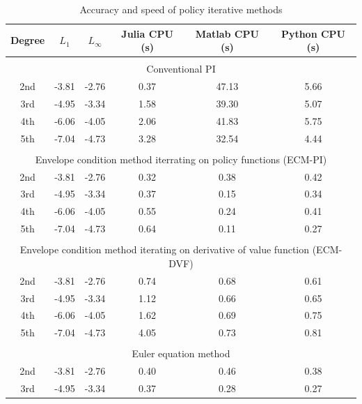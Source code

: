 \begin{table}[tph]
  \caption{Accuracy and speed of policy iterative methods}
  \label{clmm:Table2}\vspace{-0.3cm}
  \par
  \begin{center}
  \begin{threeparttable}
{\footnotesize
  \begin{tabular}{c|cc|ccc}
    \hline \hline
    Degree & $L_1$ & $L_\infty$ & Julia CPU (s) & Matlab CPU (s) & Python CPU (s) \\ \hline
    \multicolumn{6}{c}{} \\
    \multicolumn{6}{c}{Conventional PI} \\ \hline
    2nd & -3.81 & -2.76 & 0.37 & 47.13 & 5.66 \\
    3rd & -4.95 & -3.34 & 1.58 & 39.30 & 5.07 \\
    4th & -6.06 & -4.05 & 2.06 & 41.83 & 5.75 \\
    5th & -7.04 & -4.73 & 3.28 & 32.54 & 4.44 \\ \hline
    \multicolumn{6}{c}{} \\
    \multicolumn{6}{c}{Envelope condition method iterrating on policy functions
    (ECM-PI)} \\ \hline
    2nd & -3.81 & -2.76 & 0.32 & 0.38 & 0.42 \\
    3rd & -4.95 & -3.34 & 0.37 & 0.15 & 0.34 \\
    4th & -6.06 & -4.05 & 0.55 & 0.24 & 0.41 \\
    5th & -7.04 & -4.73 & 0.64 & 0.11 & 0.27 \\ \hline
    \multicolumn{6}{c}{} \\
    \multicolumn{6}{c}{Envelope condition method iterating on derivative of
    value function (ECM-DVF)} \\ \hline
    2nd & -3.81 & -2.76 & 0.74 & 0.68 & 0.61 \\
    3rd & -4.95 & -3.34 & 1.12 & 0.66 & 0.65 \\
    4th & -6.06 & -4.05 & 1.62 & 0.69 & 0.75 \\
    5th & -7.04 & -4.73 & 4.05 & 0.73 & 0.81 \\ \hline
    \multicolumn{6}{c}{} \\
    \multicolumn{6}{c}{Euler equation method} \\ \hline
    2nd & -3.81 & -2.76 & 0.40 & 0.46 & 0.38 \\
    3rd & -4.95 & -3.34 & 0.37 & 0.28 & 0.27 \\

\end{tabular}}
\end{threeparttable}
\end{center}
\end{table}

